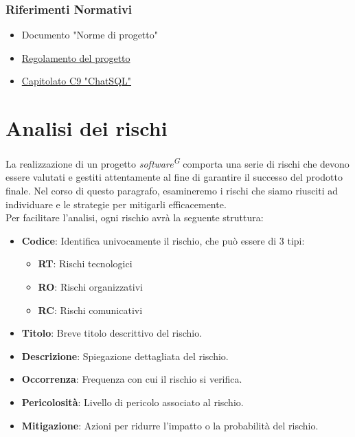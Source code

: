 \documentclass[5pt]{article}
\begin{document}
\subsubsection{Riferimenti Normativi}
\begin{itemize}
      \item Documento "Norme di progetto"
      \item \href{https://www.math.unipd.it/~tullio/IS-1/2023/Dispense/PD2.pdf}{Regolamento del progetto}
      \item \href{https://www.math.unipd.it/~tullio/IS-1/2023/Progetto/C9.pdf}{Capitolato C9 "ChatSQL"} 
\end{itemize}

\section{Analisi dei rischi}
La realizzazione di un progetto \textit{software\textsuperscript{G}} comporta una serie di rischi che devono essere valutati e gestiti attentamente al fine di garantire il successo del prodotto finale. Nel corso di questo paragrafo, esamineremo i rischi che siamo riusciti ad individuare e le strategie per mitigarli efficacemente. \\[1\baselineskip]
Per facilitare l'analisi, ogni rischio avrà la seguente struttura:
\begin{itemize}
  \item \textbf{Codice}: Identifica univocamente il rischio, che può essere di 3 tipi:
      \begin{itemize}
      \item \textbf{RT}: Rischi tecnologici
      \item \textbf{RO}: Rischi organizzativi
      \item \textbf{RC}: Rischi comunicativi
      \end{itemize}
  \item \textbf{Titolo}: Breve titolo descrittivo del rischio.
  \item \textbf{Descrizione}: Spiegazione dettagliata del rischio.
  \item \textbf{Occorrenza}: Frequenza con cui il rischio si verifica.
  \item \textbf{Pericolosità}: Livello di pericolo associato al rischio.
  \item \textbf{Mitigazione}: Azioni per ridurre l'impatto o la probabilità del rischio.
\end{itemize}
\end{document}
